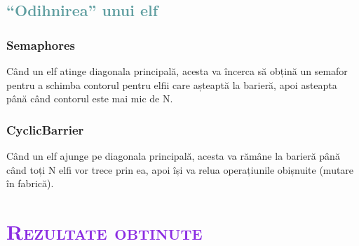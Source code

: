 \documentclass{article}
\begin{document}
\subsection{\textcolor{CadetBlue}{“Odihnirea” unui elf}}
\subsubsection{\textcolor{Periwinkle}{Semaphores}}
Când un elf atinge diagonala principală, acesta va încerca să obțină un semafor pentru a schimba contorul pentru elfii care așteaptă la barieră, apoi asteapta până când contorul este mai mic de N. 
\subsubsection{\textcolor{Periwinkle}{CyclicBarrier}}
Când un elf ajunge pe diagonala principală, acesta va rămâne la barieră până când toți N elfi vor trece prin ea, apoi își va relua operațiunile obișnuite (mutare în fabrică).

\section{\bfseries\scshape\textcolor{BlueViolet}{Rezultate obtinute}}
\end{document}

